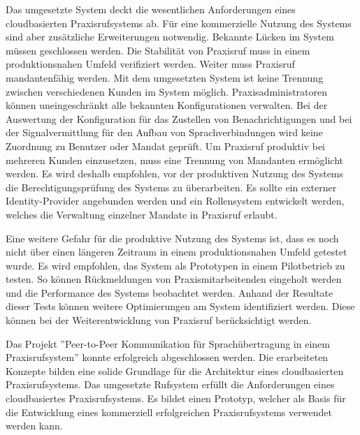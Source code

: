 Das umgesetzte System deckt die wesentlichen Anforderungen eines cloudbasierten Praxisrufsystems ab.
Für eine kommerzielle Nutzung des Systems sind aber zusätzliche Erweiterungen notwendig.
Bekannte Lücken im System müssen geschlossen werden.
Die Stabilität von Praxisruf muss in einem produktionsnahen Umfeld verifiziert werden.
Weiter muss Praxisruf mandantenfähig werden.
Mit dem umgesetzten System ist keine Trennung zwischen verschiedenen Kunden im System möglich.
Praxisadministratoren können uneingeschränkt alle bekannten Konfigurationen verwalten.
Bei der Auswertung der Konfiguration für das Zustellen von Benachrichtigungen und bei der Signalvermittlung für den Aufbau von Sprachverbindungen wird keine Zuordnung zu Benutzer oder Mandat geprüft.
Um Praxisruf produktiv bei mehreren Kunden einzusetzen, muss eine Trennung von Mandanten ermöglicht werden.
Es wird deshalb empfohlen, vor der produktiven Nutzung des Systems die Berechtigungsprüfung des Systems zu überarbeiten.
Es sollte ein externer Identity-Provider angebunden werden und ein Rollensystem entwickelt werden, welches die Verwaltung einzelner Mandate in Praxisruf erlaubt.

Eine weitere Gefahr für die produktive Nutzung des Systems ist, dass es noch nicht über einen längeren Zeitraum in einem produktionsnahen Umfeld getestet wurde.
Es wird empfohlen, das System als Prototypen in einem Pilotbetrieb zu testen.
So können Rückmeldungen von Praxismitarbeitenden eingeholt werden und die Performance des Systems beobachtet werden.
Anhand der Resultate dieser Tests können weitere Optimierungen am System identifiziert werden.
Diese können bei der Weiterentwicklung von Praxisruf berücksichtigt werden.

Das Projekt ''Peer-to-Peer Kommunikation für Sprachübertragung in einem Praxisrufsystem'' konnte erfolgreich abgeschlossen werden.
Die erarbeiteten Konzepte bilden eine solide Grundlage für die Architektur eines cloudbasierten Praxisrufsystems.
Das umgesetzte Rufsystem erfüllt die Anforderungen eines cloudbasiertes Praxisrufsystems.
Es bildet einen Prototyp, welcher als Basis für die Entwicklung eines kommerziell erfolgreichen Praxisrufsystems verwendet werden kann.

\clearpage
